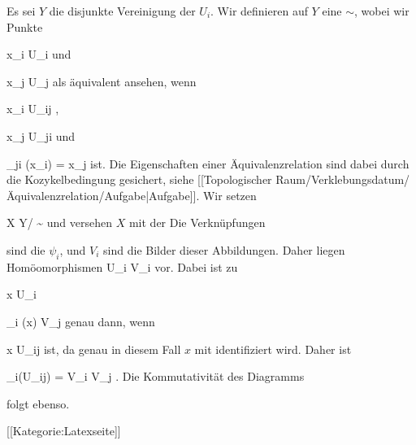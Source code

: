Es sei $Y$ die disjunkte Vereinigung der $U_i$. Wir definieren auf $Y$ eine
$\sim$, wobei wir Punkte

\mavergleichskette
{\vergleichskette
{ x_i
}
{ \in }{ U_i
}
{  }{
}
{    }{
}
{   }{
}
}
{}{}{}
und

\mavergleichskette
{\vergleichskette
{ x_j
}
{ \in }{ U_j
}
{  }{
}
{    }{
}
{   }{
}
}
{}{}{}
als äquivalent ansehen, wenn

\mavergleichskette
{\vergleichskette
{ x_i
}
{ \in }{ U_{ij}
}
{  }{
}
{    }{
}
{   }{
}
}
{}{}{,}

\mavergleichskette
{\vergleichskette
{ x_j
}
{ \in }{ U_{ji}
}
{  }{
}
{    }{
}
{   }{
}
}
{}{}{}
und

\mavergleichskette
{\vergleichskette
{ \varphi_{ji} (x_i)
}
{ = }{ x_j
}
{  }{
}
{    }{
}
{   }{
}
}
{}{}{}
ist. Die Eigenschaften einer Äquivalenzrelation sind dabei durch die Kozykelbedingung gesichert, siehe
[[Topologischer Raum/Verklebungsdatum/Äquivalenzrelation/Aufgabe|Aufgabe]].
Wir setzen

\mavergleichskettedisp
{\vergleichskette
{X
}
{ } { Y/ \sim
}
{ } {
}
{ } {
}
{ } {
}
}
{}{}{}
und versehen $X$ mit der
Die Verknüpfungen

 {  }

sind die $\psi_i$, und $V_i$ sind die Bilder dieser Abbildungen. Daher liegen Homöomorphismen
 {U_i } { V_i
} {}
vor. Dabei ist zu

\mavergleichskette
{\vergleichskette
{ x
}
{ \in }{ U_i
}
{  }{
}
{    }{
}
{   }{
}
}
{}{}{}

\mavergleichskettedisp
{\vergleichskette
{ \psi_i (x)
}
{ \in} { V_j
}
{ } {
}
{ } {
}
{ } {
}
}
{}{}{}
genau dann, wenn

\mavergleichskette
{\vergleichskette
{ x
}
{ \in }{ U_{ij}
}
{  }{
}
{    }{
}
{   }{
}
}
{}{}{}
ist, da genau in diesem Fall $x$ mit
 identifiziert wird. Daher ist

\mavergleichskette
{\vergleichskette
{ \psi_i(U_{ij})
}
{ = }{ V_i \cap V_j
}
{  }{
}
{    }{
}
{   }{
}
}
{}{}{.}
Die Kommutativität des Diagramms

 {  }

folgt ebenso.

 [[Kategorie:Latexseite]]
